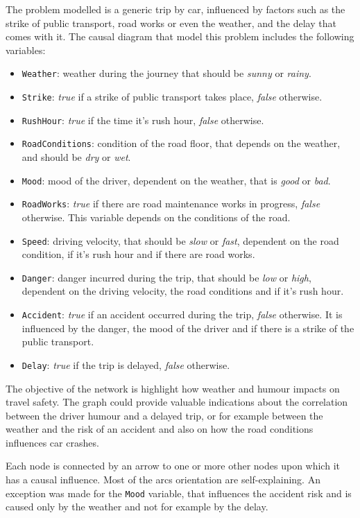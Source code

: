 \documentclass[a4paper,12pt]{article} %
\begin{document}
The problem modelled is a generic trip by car, influenced by factors such as the strike of public transport, road works or even the weather, and the delay that comes with it. 
The causal diagram that model this problem includes the following variables:
\begin{itemize}
	\item \texttt{Weather}: weather during the journey that should be \textit{sunny} or \textit{rainy}.
	\item \texttt{Strike}: \textit{true} if a strike of public transport takes place, \textit{false} otherwise.
	\item \texttt{RushHour}: \textit{true} if the time it’s rush hour, \textit{false} otherwise.
	\item \texttt{RoadConditions}: condition of the road floor, that depends on the weather, and should be \textit{dry} or \textit{wet}.
	\item \texttt{Mood}: mood of the driver, dependent on the weather, that is \textit{good} or \textit{bad}.
	\item \texttt{RoadWorks}: \textit{true} if there are road maintenance works in progress, \textit{false} otherwise. This variable depends on the conditions of the road.
	\item \texttt{Speed}: driving velocity, that should be \textit{slow} or \textit{fast}, dependent on the road condition, if it’s rush hour and if there are road works.
	\item \texttt{Danger}: danger incurred during the trip, that should be \textit{low} or \textit{high}, dependent on the driving velocity, the road conditions and if it’s rush hour. %
	\item \texttt{Accident}: \textit{true} if an accident occurred during the trip, \textit{false} otherwise. It is influenced by the danger, the mood of the driver and if there is a strike of the public transport.
	\item \texttt{Delay}: \textit{true} if the trip is delayed, \textit{false} otherwise.
\end{itemize}

The objective of the network is highlight how weather and humour impacts on travel safety. 
The graph could provide valuable indications about the correlation between the driver humour and a delayed trip, or for example between the weather and the risk of an accident and also on how the road conditions influences car crashes.

Each node is connected by an arrow to one or more other nodes upon which it has a causal influence. Most of the arcs orientation are self-explaining. An exception was made for the \texttt{Mood} variable, that influences the accident risk and is caused only by the weather and not for example by the delay. 
\end{document}
